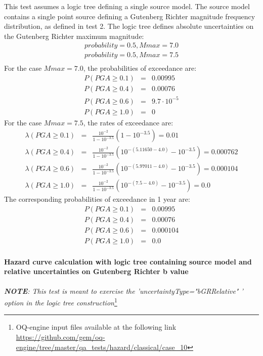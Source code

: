 This test assumes a logic tree defining a single source model. The source model
contains a single point source defining a Gutenberg Richter magnitude frequency
distribution, as defined in test 2. The logic tree defines absolute
uncertainties on the Gutenberg Richter maximum magnitude:
\begin{eqnarray}
probability = 0.5, Mmax = 7.0 \nonumber \\
probability = 0.5, Mmax = 7.5 \nonumber \\
\end{eqnarray}
For the case $Mmax = 7.0$, the probabilities of exceedance are:
\begin{eqnarray}
P(PGA \geq 0.1) &=& 0.00995 \nonumber \\
P(PGA \geq 0.4) &=& 0.00076 \nonumber \\
P(PGA \geq 0.6) &=& 9.7 \cdot 10^{-5} \nonumber \\
P(PGA \geq 1.0) &=& 0
\end{eqnarray}
For the case $Mmax = 7.5$, the rates of exceedance are:
\begin{eqnarray}
\lambda(PGA \geq 0.1) &=&  \frac{10^{-2}}{1 - 10^{-3.5}} (1 - 10^{-3.5}) = 0.01\nonumber \\ 
\lambda(PGA \geq 0.4) &=&  \frac{10^{-2}}{1 - 10^{-3.5}} (10^{-(5.11650 - 4.0)} - 10^{-3.5}) = 0.000762\nonumber \\
\lambda(PGA \geq 0.6) &=&  \frac{10^{-2}}{1 - 10^{-3.5}} (10^{-(5.97011 - 4.0)} - 10^{-3.5}) = 0.000104\nonumber \\ 
\lambda(PGA \geq 1.0) &=&  \frac{10^{-2}}{1 - 10^{-3.5}} (10^{-(7.5 - 4.0)} - 10^{-3.5}) = 0.0
\end{eqnarray}
The corresponding probabilities of exceedance in 1 year are:
\begin{eqnarray}
P(PGA \geq 0.1) &=&  0.00995\nonumber \\
P(PGA \geq 0.4) &=&  0.00076\nonumber \\
P(PGA \geq 0.6) &=&  0.000104\nonumber \\
P(PGA \geq 1.0) &=& 0.0
\end{eqnarray}
%
\clearpage
%
\paragraph{Hazard curve calculation with logic tree containing source
model and relative uncertainties on Gutenberg Richter b value}
\textit{\textbf{NOTE}: This test is meant to exercise the
'uncertaintyType="bGRRelative" ' option in the logic tree construction}\footnote{
    OQ-engine input files available at the following link
    \url{https://github.com/gem/oq-engine/tree/master/qa_tests/hazard/classical/case_10}}

